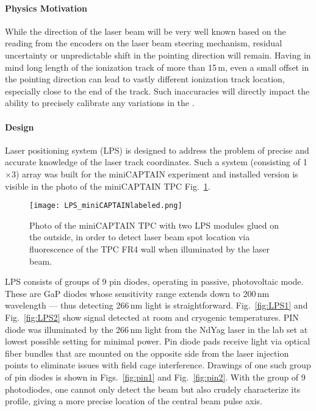 
\label{sec:calib-laser-pos}
\paragraph{Physics Motivation}

While the direction of the laser beam will be very well known based on the reading from the encoders on the laser beam steering mechanism,  residual uncertainty or unpredictable shift in the pointing direction will remain. Having in mind long length of the ionization track of more than 15\,m, even a small offset in the pointing direction can lead to vastly different ionization track location, especially close to the end of
the track. Such inaccuracies will directly impact the ability to precisely calibrate any variations in the \efield.

\paragraph{Design}

Laser positioning system (LPS) is designed to address the problem of precise and accurate knowledge of the laser track coordinates. %
Such a system (consisting of 1$\times$3) array was built for the miniCAPTAIN experiment and installed version is visible in the photo of the miniCAPTAIN TPC Fig.~\ref{fig:miniCAPTAIN}.  
\begin{figure}[htb!] 
\centering 
\texttt{[image: LPS\_miniCAPTAINlabeled.png]} 
\caption{Photo of the miniCAPTAIN TPC with two LPS modules glued on the outside, in order to detect laser beam spot location via fluorescence of the TPC FR4 wall when illuminated by the laser beam.}
\label{fig:miniCAPTAIN} 
\end{figure}
LPS consists of groups of 9 pin diodes, operating in passive, photovoltaic mode. These are GaP diodes whose sensitivity range extends down to 200\,nm wavelength --- thus detecting 266\,nm light is straightforward. Fig.~\ref{fig:LPS1} and Fig.~\ref{fig:LPS2}  show signal detected at room and cryogenic
temperatures. PIN diode was illuminated by the 266\,nm light from the NdYag
laser in the lab 
set at lowest possible setting for minimal power. Pin diode pads receive light via optical fiber bundles that are mounted on the opposite side from the laser injection points to eliminate issues with field cage interference. Drawings of one such group of pin diodes is shown in Figs.~\ref{fig:pin1} and Fig.~\ref{fig:pin2}. With the group of 9 photodiodes, one cannot only detect the beam but also crudely characterize its profile, giving a more precise location of the central beam pulse axis.


